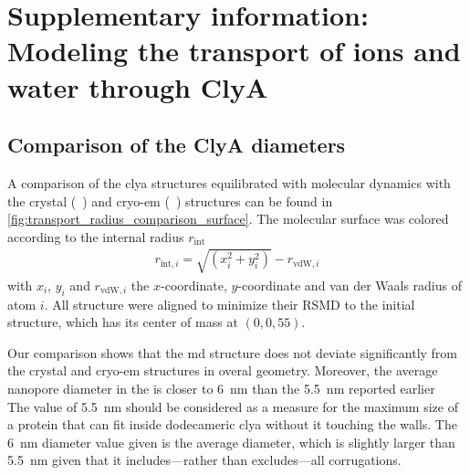 %
\chapter[SI: Modeling the transport of ions and water through {ClyA}]%
        {Supplementary information: Modeling the transport of ions and water through {ClyA}}
%
\label{ch:transport_appendix}
%

\begin{shaded}
\newpage
\end{shaded}


\section{Comparison of the {ClyA} \lumen{} diameters}
%
\label{sec:transport_appendix:radius_comparision}
%

A comparison of the \gls{clya} structures equilibrated with molecular dynamics with the crystal
(~\cite{Mueller-2009}) and \gls{cryo-em} (~\cite{Peng-2019}) structures can be found
in \cref{fig:transport_radius_comparison_surface}. The molecular surface was colored according to the internal
radius $r_{\text{int}}$
%
\begin{align}\label{eq:internal_radius}
  r_{\text{int},i} = \sqrt{(x_i^2 + y_i^2)} - r_{\text{vdW},i}
\end{align}
%
with $x_i$, $y_i$ and $r_{\text{vdW},i}$ the $x$-coordinate, $y$-coordinate and van der Waals radius of atom
$i$. All structure were aligned to minimize their RSMD to the initial structure, which has its center of mass
at $(0,0,55)$.

Our comparison shows that the \gls{md} structure does not deviate significantly from the crystal and
\gls{cryo-em} structures in overal geometry. Moreover, the average nanopore diameter in the \cisi{} \lumen{}
is closer to \SI{6}{\nm} than the \SI{5.5}{\nm} reported earlier~\cite{Willems-Ruic-Biesemans-2019} The value
of \SI{5.5}{\nm} should be considered as a measure for the maximum size of a protein that can fit inside
dodecameric \gls{clya} without it touching the walls. The \SI{6}{\nm} diameter value given is the average
\lumen{} diameter, which is slightly larger than \SI{5.5}{\nm} given that it includes---rather than
excludes---all corrugations. 

